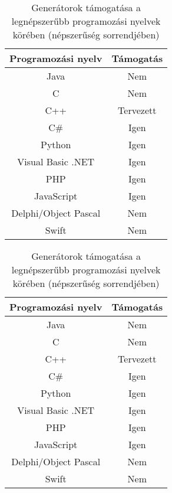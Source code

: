 \if{}
  \begin{table}
  \captionsetup{justification=centering}
  \centering
    \begin{tabular}{|| c | c ||}
    \hline
    Programozási nyelv & Támogatás \\
    \hline \hline
    Java                  & \cellcolor{red!20}Nem \\
    C                     & \cellcolor{red!20}Nem \\
    C++                   & \cellcolor{yellow!20}Tervezett \\
    C\#                   & \cellcolor{green!20}Igen \\
    Python                & \cellcolor{green!20}Igen \\
    Visual Basic .NET     & \cellcolor{green!20}Igen \\
    PHP                   & \cellcolor{green!20}Igen \\
    JavaScript            & \cellcolor{green!20}Igen \\
    Delphi/Object Pascal  & \cellcolor{red!20}Nem \\
    Swift                 & \cellcolor{red!20}Nem \\
    \hline
    \end{tabular}
  \caption{Generátorok támogatása a legnépszerűbb programozási nyelvek körében (népszerűség sorrendjében)}  
  \label{table:1}
  \end{table}
\else
  \begin{table}
  \captionsetup{justification=centering}
  \centering
    \begin{tabular}{|| c | c ||}
    \hline
    Programozási nyelv & Támogatás \\
    \hline \hline
    Java                  & Nem \\
    C                     & Nem \\
    C++                   & Tervezett \\
    C\#                   & Igen \\
    Python                & Igen \\
    Visual Basic .NET     & Igen \\
    PHP                   & Igen \\
    JavaScript            & Igen \\
    Delphi/Object Pascal  & Nem \\
    Swift                 & Nem \\
    \hline
    \end{tabular}
  \caption{Generátorok támogatása a legnépszerűbb programozási nyelvek körében (népszerűség sorrendjében)}  
  \label{table:1}
  \end{table}
\fi
